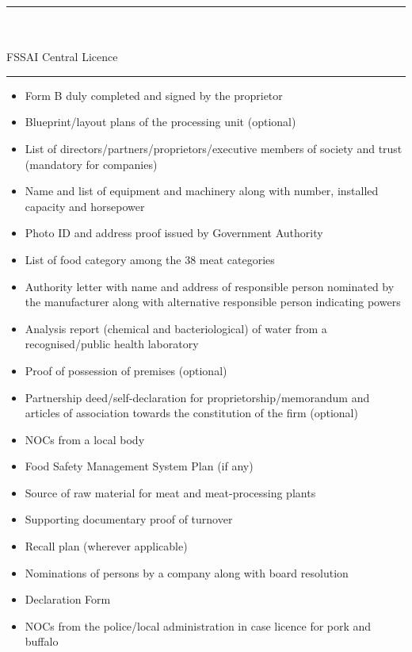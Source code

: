 \documentclass[a4paper, 12pt]{article}
\begin{document}
\noindent\rule{16cm}{0.4pt}\\
	\\
FSSAI Central Licence\\
\noindent\rule{16cm}{0.4pt}
\begin{itemize}[noitemsep]
\item Form B duly completed and signed by the proprietor 
\item Blueprint/layout plans of the processing unit (optional) 
\item List of directors/partners/proprietors/executive members of society and trust (mandatory for companies) 
\item Name and list of equipment and machinery along with number, installed capacity and horsepower  
\item Photo ID and address proof issued by Government Authority 
\item List of food category among the 38 meat categories
\item Authority letter with name and address of responsible person nominated by the manufacturer along with alternative responsible person indicating powers   
\item Analysis report (chemical and bacteriological) of water from a recognised/public health laboratory  
\item Proof of possession of premises (optional) 
\item Partnership deed/self-declaration for proprietorship/memorandum and articles of association towards the constitution of the firm (optional)   
\item NOCs from a local body 
\item Food Safety Management System Plan (if any) 
\item Source of raw material for meat and meat-processing plants 
\item Supporting documentary proof of turnover 
\item Recall plan (wherever applicable) 
\item Nominations of persons by a company along with board resolution 
\item Declaration Form 
\item NOCs from the police/local administration in case licence for pork and buffalo  
\end{itemize}
\end{document}
